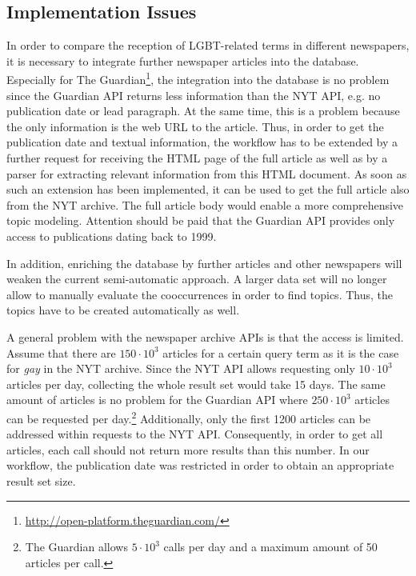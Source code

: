\documentclass[10pt,a4paper,twocolumn]{scrartcl}
\begin{document}
\subsection{Implementation Issues}
In order to compare the reception of LGBT-related terms in different newspapers, it is necessary to integrate further newspaper articles into the database. Especially for The Guardian\footnote{\url{http://open-platform.theguardian.com/}}, the integration into the database is no problem since the Guardian API returns less information than the NYT API, e.g. no publication date or lead paragraph. At the same time, this is a problem because the only information is the web URL to the article. Thus, in order to get the publication date and textual information, the workflow has to be extended by a further request for receiving the HTML page of the full article as well as by a parser for extracting relevant information from this HTML document. As soon as such an extension has been implemented, it can be used to get the full article also from the NYT archive. The full article body would enable a more comprehensive topic modeling. Attention should be paid that the Guardian API provides only access to publications dating back to 1999.

In addition, enriching the database by further articles and other newspapers will weaken the current semi-automatic approach. A larger data set will no longer allow to manually evaluate the cooccurrences in order to find topics. Thus, the topics have to be created automatically as well.

A general problem with the newspaper archive APIs is that the access is limited. Assume that there are $150 \cdot 10^3$ articles for a certain query term as it is the case for \textit{gay} in the NYT archive. Since the NYT API allows requesting only $10\cdot 10^3$ articles per day, collecting the whole result set would take 15 days. The same amount of articles is no problem for the Guardian API where $250\cdot 10^3$ articles can be requested per day.\footnote{The Guardian allows $5\cdot 10^3$ calls per day and a maximum amount of 50 articles per call.} Additionally, only the first 1200 articles can be addressed within requests to the NYT API. Consequently, in order to get all articles, each call should not return more results than this number. In our workflow, the publication date was restricted in order to obtain an appropriate result set size.
\end{document}
